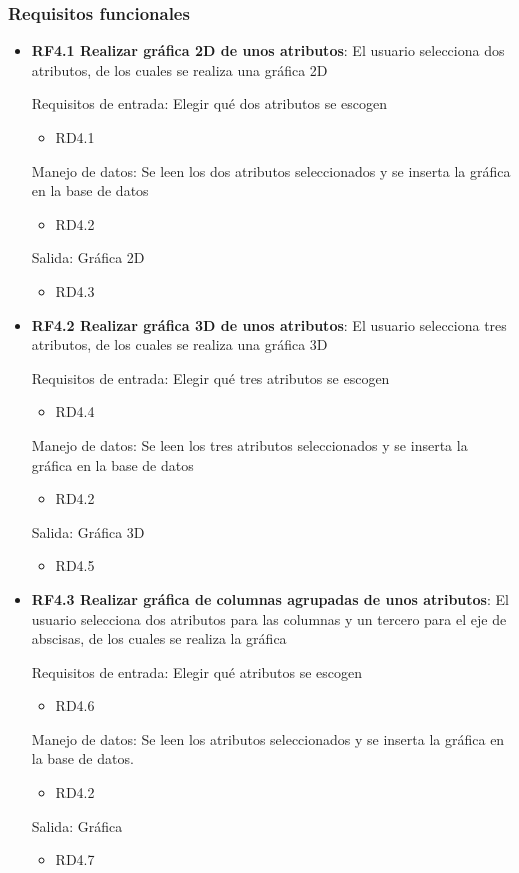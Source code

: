 \subsubsection{Requisitos funcionales}
\begin{itemize}
	\item \textbf{RF4.1 Realizar gráfica 2D de unos atributos}: El usuario selecciona dos atributos, de los cuales se realiza una gráfica 2D
	
	Requisitos de entrada: Elegir qué dos atributos se escogen
	\begin{itemize}
		\item RD4.1
	\end{itemize}
	Manejo de datos: Se leen los dos atributos seleccionados  y se inserta la gráfica en la base de datos
	\begin{itemize}
		\item RD4.2
	\end{itemize}
	Salida: Gráfica 2D
	\begin{itemize}
		\item RD4.3
	\end{itemize}
	
	\item \textbf{RF4.2 Realizar gráfica 3D de unos atributos}: El usuario selecciona tres atributos, de los cuales se realiza una gráfica 3D
	
	Requisitos de entrada: Elegir qué tres atributos se escogen
	\begin{itemize}
		\item RD4.4
	\end{itemize}
	Manejo de datos: Se leen los tres atributos seleccionados  y se inserta la gráfica en la base de datos
	\begin{itemize}
		\item RD4.2
	\end{itemize}
	Salida: Gráfica 3D
	\begin{itemize}
		\item RD4.5
	\end{itemize}
	
	\item \textbf{RF4.3 Realizar gráfica de columnas agrupadas de unos atributos}: El usuario selecciona dos atributos para las columnas y un tercero para el eje de abscisas, de los cuales se realiza la gráfica
	
	Requisitos de entrada: Elegir qué atributos se escogen
	\begin{itemize}
		\item RD4.6
	\end{itemize}
	Manejo de datos: Se leen los atributos seleccionados y se inserta la gráfica en la base de datos.
	\begin{itemize}
		\item RD4.2
	\end{itemize}
	Salida: Gráfica
	\begin{itemize}
		\item RD4.7
	\end{itemize}
	

\end{itemize}
